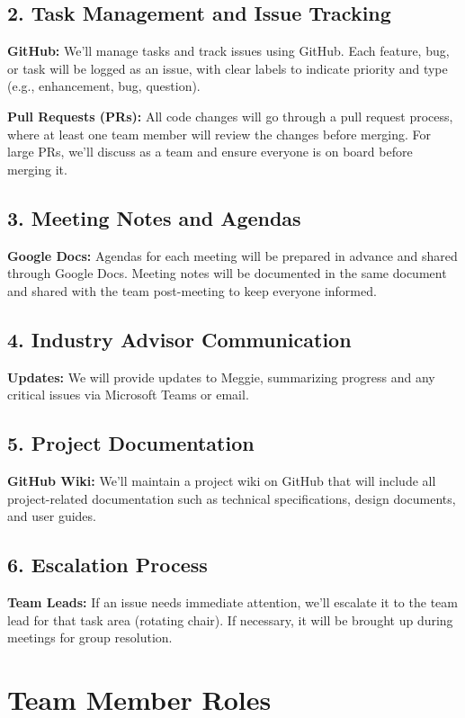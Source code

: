 \documentclass{article}
\begin{document}
\subsection*{2. Task Management and Issue Tracking}
\textbf{GitHub:} We’ll manage tasks and track issues using GitHub. Each feature, bug, or task will be logged as an issue, with clear labels to indicate priority and type (e.g., enhancement, bug, question).

\textbf{Pull Requests (PRs):} All code changes will go through a pull request process, where at least one team member will review the changes before merging. For large PRs, we’ll discuss as a team and ensure everyone is on board before merging it.

\subsection*{3. Meeting Notes and Agendas}
\textbf{Google Docs:} Agendas for each meeting will be prepared in advance and shared through Google Docs. Meeting notes will be documented in the same document and shared with the team post-meeting to keep everyone informed.

\subsection*{4. Industry Advisor Communication}
\textbf{Updates:} We will provide updates to Meggie, summarizing progress and any critical issues via Microsoft Teams or email.

\subsection*{5. Project Documentation}
\textbf{GitHub Wiki:} We’ll maintain a project wiki on GitHub that will include all project-related documentation such as technical specifications, design documents, and user guides.

\subsection*{6. Escalation Process}
\textbf{Team Leads:} If an issue needs immediate attention, we’ll escalate it to the team lead for that task area (rotating chair). If necessary, it will be brought up during meetings for group resolution.

\section{Team Member Roles}
\end{document}

